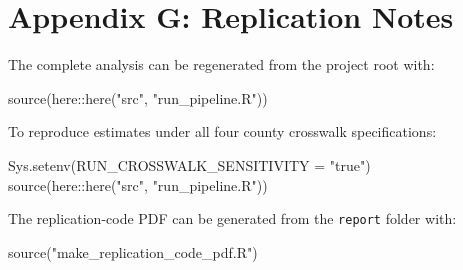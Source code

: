 \documentclass[
  11pt,
]{article}
\newenvironment{Shaded}{\begin{snugshade}}{\end{snugshade}}
\newcommand{\AttributeTok}[1]{\textcolor[rgb]{0.40,0.45,0.13}{#1}}
\newcommand{\FunctionTok}[1]{\textcolor[rgb]{0.28,0.35,0.67}{#1}}
\newcommand{\NormalTok}[1]{\textcolor[rgb]{0.00,0.23,0.31}{#1}}
\newcommand{\SpecialCharTok}[1]{\textcolor[rgb]{0.37,0.37,0.37}{#1}}
\newcommand{\StringTok}[1]{\textcolor[rgb]{0.13,0.47,0.30}{#1}}
\begin{document}
\section{Appendix G: Replication
Notes}\label{appendix-g-replication-notes}

The complete analysis can be regenerated from the project root with:

\begin{Shaded}
\begin{Highlighting}[]
\FunctionTok{source}\NormalTok{(here}\SpecialCharTok{::}\FunctionTok{here}\NormalTok{(}\StringTok{"src"}\NormalTok{, }\StringTok{"run\_pipeline.R"}\NormalTok{))}
\end{Highlighting}
\end{Shaded}

To reproduce estimates under all four county crosswalk specifications:

\begin{Shaded}
\begin{Highlighting}[]
\FunctionTok{Sys.setenv}\NormalTok{(}\AttributeTok{RUN\_CROSSWALK\_SENSITIVITY =} \StringTok{"true"}\NormalTok{)}
\FunctionTok{source}\NormalTok{(here}\SpecialCharTok{::}\FunctionTok{here}\NormalTok{(}\StringTok{"src"}\NormalTok{, }\StringTok{"run\_pipeline.R"}\NormalTok{))}
\end{Highlighting}
\end{Shaded}

The replication-code PDF can be generated from the \texttt{report}
folder with:

\begin{Shaded}
\begin{Highlighting}[]
\FunctionTok{source}\NormalTok{(}\StringTok{"make\_replication\_code\_pdf.R"}\NormalTok{)}
\end{Highlighting}
\end{Shaded}
\end{document}
